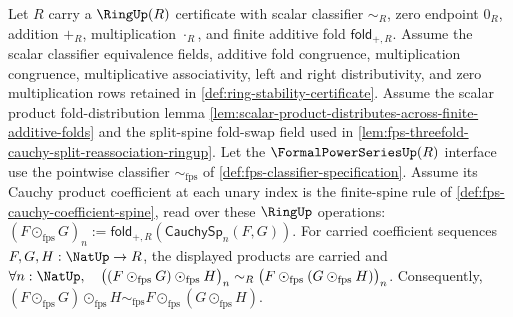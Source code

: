 \begin{theorem}
\label{thm:fps-cauchy-product-associativity-over-ringup-scalars}
Let $R$ carry a $\RingUp(R)$ certificate with scalar classifier $\sim_R$, zero endpoint $0_R$, addition $+_R$, multiplication $\cdot_R$, and finite additive fold $\mathsf{fold}_{+,R}$. Assume the scalar classifier equivalence fields, additive fold congruence, multiplication congruence, multiplicative associativity, left and right distributivity, and zero multiplication rows retained in \autoref{def:ring-stability-certificate}. Assume the scalar product fold-distribution lemma \autoref{lem:scalar-product-distributes-across-finite-additive-folds} and the split-spine fold-swap field used in \autoref{lem:fps-threefold-cauchy-split-reassociation-ringup}. Let the $\FormalPowerSeriesUp(R)$ interface use the pointwise classifier $\sim_{\mathrm{fps}}$ of \autoref{def:fps-classifier-specification}. Assume its Cauchy product coefficient at each unary index is the finite-spine rule of \autoref{def:fps-cauchy-coefficient-spine}, read over these $\RingUp$ operations: $(F\odot_{\mathrm{fps}}G)_n:=\mathsf{fold}_{+,R}(\mathsf{CauchySp}_n(F,G))$. For carried coefficient sequences $F,G,H:\NatUp\to R$, the displayed products are carried and $\forall n:\NatUp,\quad \bigl((F\odot_{\mathrm{fps}}G)\odot_{\mathrm{fps}}H\bigr)_n\sim_R\bigl(F\odot_{\mathrm{fps}}(G\odot_{\mathrm{fps}}H)\bigr)_n$. Consequently, $(F\odot_{\mathrm{fps}}G)\odot_{\mathrm{fps}}H\sim_{\mathrm{fps}}F\odot_{\mathrm{fps}}(G\odot_{\mathrm{fps}}H)$.
\end{theorem}
